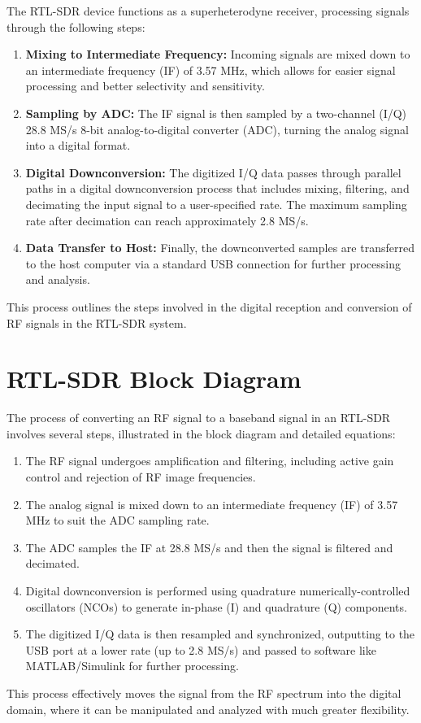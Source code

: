 The RTL-SDR device functions as a superheterodyne receiver, processing signals through the following steps:
\begin{enumerate}
    \item \textbf{Mixing to Intermediate Frequency:} Incoming signals are mixed down to an intermediate frequency (IF) of 3.57 MHz, which allows for easier signal processing and better selectivity and sensitivity.
    \item \textbf{Sampling by ADC:} The IF signal is then sampled by a two-channel (I/Q) 28.8 MS/s 8-bit analog-to-digital converter (ADC), turning the analog signal into a digital format.
    \item \textbf{Digital Downconversion:} The digitized I/Q data passes through parallel paths in a digital downconversion process that includes mixing, filtering, and decimating the input signal to a user-specified rate. The maximum sampling rate after decimation can reach approximately 2.8 MS/s.
    \item \textbf{Data Transfer to Host:} Finally, the downconverted samples are transferred to the host computer via a standard USB connection for further processing and analysis.
\end{enumerate}
This process outlines the steps involved in the digital reception and conversion of RF signals in the RTL-SDR system.


\section*{RTL-SDR Block Diagram}

The process of converting an RF signal to a baseband signal in an RTL-SDR involves several steps, illustrated in the block diagram and detailed equations:
\begin{enumerate}
    \item The RF signal undergoes amplification and filtering, including active gain control and rejection of RF image frequencies.
    \item The analog signal is mixed down to an intermediate frequency (IF) of 3.57 MHz to suit the ADC sampling rate.
    \item The ADC samples the IF at 28.8 MS/s and then the signal is filtered and decimated.
    \item Digital downconversion is performed using quadrature numerically-controlled oscillators (NCOs) to generate in-phase (I) and quadrature (Q) components.
    \item The digitized I/Q data is then resampled and synchronized, outputting to the USB port at a lower rate (up to 2.8 MS/s) and passed to software like MATLAB/Simulink for further processing.
\end{enumerate}
This process effectively moves the signal from the RF spectrum into the digital domain, where it can be manipulated and analyzed with much greater flexibility.


